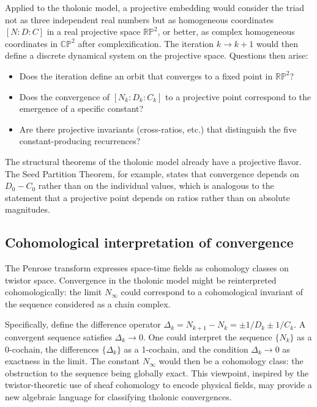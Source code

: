 \documentclass[12pt]{article}
\begin{document}
Applied to the tholonic model, a projective embedding would consider the triad not as
three independent real numbers but as homogeneous coordinates $[N : D : C]$ in a real
projective space $\mathbb{RP}^2$, or better, as complex homogeneous coordinates in
$\mathbb{CP}^2$ after complexification.  The iteration $k \to k+1$ would then define a
discrete dynamical system on the projective space.  Questions then arise:
\begin{itemize}
  \item Does the iteration define an orbit that converges to a fixed point in $\mathbb{RP}^2$?
  \item Does the convergence of $[N_k : D_k : C_k]$ to a projective point correspond to
        the emergence of a specific constant?
  \item Are there projective invariants (cross-ratios, etc.) that distinguish the five
        constant-producing recurrences?
\end{itemize}
The structural theorems of the tholonic model already have a projective flavor.  The Seed
Partition Theorem, for example, states that convergence depends on $D_0 - C_0$ rather
than on the individual values, which is analogous to the statement that a projective
point depends on ratios rather than on absolute magnitudes.

\subsection{Cohomological interpretation of convergence}\label{sec:cohomological}

The Penrose transform expresses space-time fields as cohomology classes on twistor
space.  Convergence in the tholonic model might be reinterpreted cohomologically: the
limit $N_\infty$ could correspond to a cohomological invariant of the sequence
considered as a chain complex.

Specifically, define the difference operator $\Delta_k = N_{k+1} - N_k = \pm 1/D_k
\pm 1/C_k$.  A convergent sequence satisfies $\Delta_k \to 0$.  One could interpret the
sequence $\{N_k\}$ as a 0-cochain, the differences $\{\Delta_k\}$ as a 1-cochain, and
the condition $\Delta_k \to 0$ as exactness in the limit.  The constant $N_\infty$ would
then be a cohomology class: the obstruction to the sequence being globally exact.  This
viewpoint, inspired by the twistor-theoretic use of sheaf cohomology to encode physical
fields, may provide a new algebraic language for classifying tholonic convergences.
\end{document}
